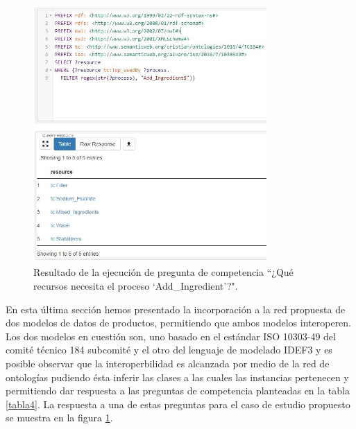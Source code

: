 \documentclass[journal]{IEEEtran}
\begin{document}
\begin{figure}[!t]
\centering
\includegraphics[width=3.5in]{figures/figure13.jpg}
\caption{Resultado de la ejecuci\'on de pregunta de competencia ``¿Qu\'e recursos necesita el proceso ‘Add\_Ingredient’?".}
\label{fig13}
\end{figure}


En esta \'ultima secci\'on hemos presentado la incorporación a la red propuesta de dos modelos de datos de productos, permitiendo que ambos modelos interoperen. Los dos modelos en cuesti\'on son, uno basado en el est\'andar ISO 10303-49 del comit\'e t\'ecnico 184 subcomit\'e y el otro del lenguaje de modelado IDEF3 y es posible observar que  la interoperbilidad es alcanzada por medio de la red de ontolog\'ias pudiendo \'esta inferir las clases a las cuales las instancias pertenecen y permitiendo dar respuesta a las preguntas de competencia planteadas en la tabla \ref{tabla4}. La respuesta a una de estas preguntas para el caso de estudio propuesto se muestra en la figura \ref{fig13}.

%
%
\end{document}
